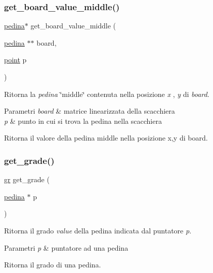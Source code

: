 \subsubsection{\texorpdfstring{get\+\_\+board\+\_\+value\+\_\+middle()}{get\_board\_value\_middle()}}
{\footnotesize\ttfamily \hyperlink{ml__lib_8h_a71fee95122b31f5cb0b07d9c16ffa3a5}{pedina}$\ast$ get\+\_\+board\+\_\+value\+\_\+middle (\begin{DoxyParamCaption}\item[{\hyperlink{ml__lib_8h_a71fee95122b31f5cb0b07d9c16ffa3a5}{pedina} $\ast$$\ast$}]{board,  }\item[{\hyperlink{structpunto}{point}}]{p }\end{DoxyParamCaption})}



Ritorna la {\itshape pedina} \char`\"{}middle\char`\"{} contenuta nella posizione {\itshape x} , {\itshape y} di {\itshape board}. 


\begin{DoxyParams}{Parametri}
{\em board} & matrice linearizzata della scacchiera \\
\hline
{\em p} & punto in cui si trova la pedina nella scacchiera\\
\hline
\end{DoxyParams}
Ritorna il valore della pedina middle nella posizione x,y di board. \mbox{\label{group__Ausiliarie_ga6ceb2e2fb4d39456d2b64b64f4841c67}} 
\subsubsection{\texorpdfstring{get\+\_\+grade()}{get\_grade()}}
{\footnotesize\ttfamily \hyperlink{ml__lib_8h_a25f6e8adc446355e3f42092ecf9d598c}{gr} get\+\_\+grade (\begin{DoxyParamCaption}\item[{\hyperlink{ml__lib_8h_a71fee95122b31f5cb0b07d9c16ffa3a5}{pedina} $\ast$}]{p }\end{DoxyParamCaption})}



Ritorna il grado {\itshape value} della pedina indicata dal puntatore {\itshape p}. 


\begin{DoxyParams}{Parametri}
{\em p} & puntatore ad una pedina\\
\hline
\end{DoxyParams}
Ritorna il grado di una pedina. \mbox{\label{group__Ausiliarie_gaeebe06189e2bd221a0e65b7d15f6b1b5}} 
